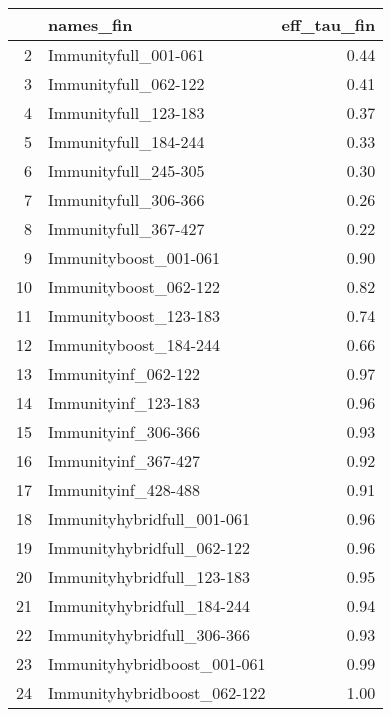 \begin{table}[ht]
\centering
\begin{tabular}{rlr}
  \hline
 & names\_fin & eff\_tau\_fin \\ 
  \hline
2 & Immunityfull\_001-061 & 0.44 \\ 
  3 & Immunityfull\_062-122 & 0.41 \\ 
  4 & Immunityfull\_123-183 & 0.37 \\ 
  5 & Immunityfull\_184-244 & 0.33 \\ 
  6 & Immunityfull\_245-305 & 0.30 \\ 
  7 & Immunityfull\_306-366 & 0.26 \\ 
  8 & Immunityfull\_367-427 & 0.22 \\ 
  9 & Immunityboost\_001-061 & 0.90 \\ 
  10 & Immunityboost\_062-122 & 0.82 \\ 
  11 & Immunityboost\_123-183 & 0.74 \\ 
  12 & Immunityboost\_184-244 & 0.66 \\ 
  13 & Immunityinf\_062-122 & 0.97 \\ 
  14 & Immunityinf\_123-183 & 0.96 \\ 
  15 & Immunityinf\_306-366 & 0.93 \\ 
  16 & Immunityinf\_367-427 & 0.92 \\ 
  17 & Immunityinf\_428-488 & 0.91 \\ 
  18 & Immunityhybridfull\_001-061 & 0.96 \\ 
  19 & Immunityhybridfull\_062-122 & 0.96 \\ 
  20 & Immunityhybridfull\_123-183 & 0.95 \\ 
  21 & Immunityhybridfull\_184-244 & 0.94 \\ 
  22 & Immunityhybridfull\_306-366 & 0.93 \\ 
  23 & Immunityhybridboost\_001-061 & 0.99 \\ 
  24 & Immunityhybridboost\_062-122 & 1.00 \\ 
   \hline
\end{tabular}
\end{table}
